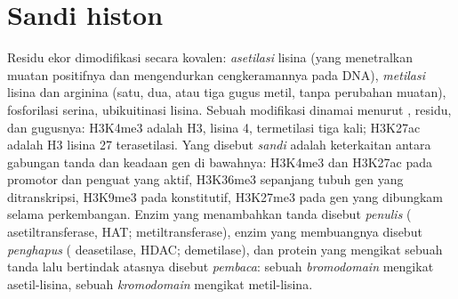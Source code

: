 \section{Sandi histon}

\begin{definition}\label{def:b3:chromatin-epigenetics:histone-code}
%
Residu ekor  dimodifikasi secara kovalen: \emph{asetilasi} lisina
(yang menetralkan muatan positifnya dan mengendurkan cengkeramannya pada
DNA), \emph{metilasi} lisina dan arginina (satu, dua, atau tiga gugus metil,
tanpa perubahan muatan), fosforilasi serina, ubikuitinasi lisina. Sebuah
modifikasi dinamai menurut , residu, dan gugusnya: H3K4me3 adalah
 H3, lisina 4, termetilasi tiga kali; H3K27ac adalah H3 lisina 27
terasetilasi. Yang disebut \emph{sandi } adalah keterkaitan antara
gabungan tanda dan keadaan gen di bawahnya: H3K4me3 dan H3K27ac pada promotor
dan penguat yang aktif, H3K36me3 sepanjang tubuh gen yang ditranskripsi,
H3K9me3 pada  konstitutif, H3K27me3 pada gen yang dibungkam
selama perkembangan. Enzim yang menambahkan tanda disebut \emph{penulis}
( asetiltransferase, HAT; metiltransferase), enzim yang membuangnya
disebut \emph{penghapus} ( deasetilase, HDAC; demetilase), dan protein
yang mengikat sebuah tanda lalu bertindak atasnya disebut \emph{pembaca}:
sebuah \emph{bromodomain} mengikat asetil-lisina, sebuah \emph{kromodomain}
mengikat metil-lisina.
\end{definition}

